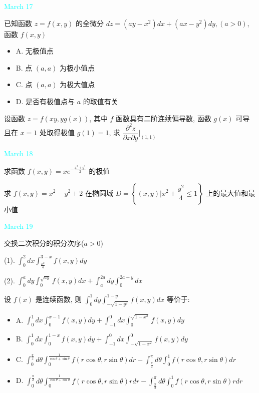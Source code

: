 \textcolor{cyan}{March 17}

\begin{example}[][Exam: 29.3.5]
	已知函数 $z=f(x,y)$ 的全微分 $dz=(ay-x^{2})dx+(ax-y^{2})dy,(a>0)$, 函数 $f(x,y)$
\begin{itemize}
	\item A. 无极值点
	\item B. 点 $(a,a)$ 为极小值点
	\item C. 点 $(a,a)$ 为极大值点
	\item D. 是否有极值点与 $a$ 的取值有关
\end{itemize}
\end{example}

\begin{example}[][Exam: 29.3.6]
	设函数 $z=f(xy,yg(x))$, 其中 $f$ 函数具有二阶连续偏导数, 函数 $g(x)$ 可导且在 $x=1$ 处取得极值 $g(1)=1$, 求 $\dfrac{\partial^{2}z}{\partial x\partial y}|_{(1,1)}$
\end{example}

\textcolor{cyan}{March 18}

\begin{example}[][Exam: 29.3.7]
	求函数 $f(x,y)=xe^{-\frac{x^{2}+y^{2}}{2}}$ 的极值
\end{example}

\begin{example}[][Exam: 29.3.8]
	求 $f(x,y)=x^{2}-y^{2}+2$ 在椭圆域 $D=\left\lbrace (x,y)|x^{2}+\dfrac{y^{2}}{4}\leq 1\right\rbrace$ 上的最大值和最小值
\end{example}

\textcolor{cyan}{March 19}

\begin{example}[][Exam: 29.3.9]
	交换二次积分的积分次序($a>0$)

(1). $\displaystyle{\int_{0}^{2}dx\int_{\frac{x^{2}}{4}}^{3-x}f(x,y)dy}$

(2). $\displaystyle{\int_{0}^{a}dy\int_{0}^{\sqrt{ay}}f(x,y)dx+\int_{a}^{2a}dy\int_{0}^{2a-y}dx}$
\end{example}

\begin{example}[][Exam: 29.3.10]
	设 $f(x)$ 是连续函数, 则 $\int_{0}^{1}dy\int_{-\sqrt{1-y^{2}}}^{1-y}f(x,y)dx$ 等价于:
\begin{itemize}
	\item A. $\int_{0}^{1}dx\int_{0}^{x-1}f(x,y)dy+\int_{-1}^{0}dx\int_{0}^{\sqrt{1-x^{2}}}f(x,y)dy$
	\item B. $\int_{0}^{1}dx\int_{0}^{1-x}f(x,y)dy+\int_{-1}^{0}dx\int_{-\sqrt{1-x^{2}}}^{0}f(x,y)dy$
	\item C. $\int_{0}^{\frac{\pi}{2}}d\theta\int_{0}^{\frac{1}{\cos\theta+\sin\theta}}f(r\cos\theta,r\sin\theta)dr-\int_{\frac{\pi}{2}}^{\pi}d\theta\int_{0}^{1}f(r\cos\theta,r\sin\theta)dr$
	\item D. $\int_{0}^{\frac{\pi}{2}}d\theta\int_{0}^{\frac{1}{\cos\theta+\sin\theta}}f(r\cos\theta,r\sin\theta)rdr-\int_{\frac{\pi}{2}}^{\pi}d\theta\int_{0}^{1}f(r\cos\theta,r\sin\theta)rdr$
\end{itemize}
\end{example}

